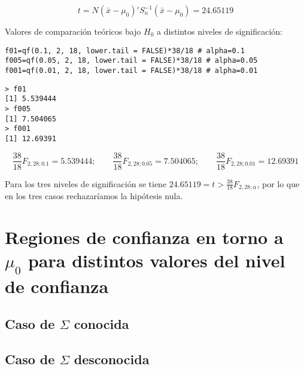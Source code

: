 \documentclass[12pt]{article}
\begin{document}
\[t=N(\bar{x}-\mu_0)'S_n^{-1}(\bar{x}-\mu_0)=24.65119\]

Valores de comparación teóricos bajo $H_0$ a distintos niveles de significación:

\begin{verbatim}
f01=qf(0.1, 2, 18, lower.tail = FALSE)*38/18 # alpha=0.1
f005=qf(0.05, 2, 18, lower.tail = FALSE)*38/18 # alpha=0.05
f001=qf(0.01, 2, 18, lower.tail = FALSE)*38/18 # alpha=0.01
\end{verbatim}

\begin{verbatim}
> f01
[1] 5.539444
> f005
[1] 7.504065
> f001
[1] 12.69391
\end{verbatim}

\[\frac{38}{18}F_{2,28;0.1}=5.539444 ; \qquad \frac{38}{18}F_{2,28;0.05}=7.504065 ; \qquad \frac{38}{18}F_{2,28;0.01}=12.69391\]

Para los tres niveles de significación se tiene
$24.65119=t>\frac{38}{18}F_{2,28;\alpha}$, por lo que en los tres casos
rechazaríamos la hipótesis nula.

\section{Regiones de confianza en torno a $\mu_0$ para distintos
  valores del nivel de confianza}

\subsection{Caso de $\Sigma$ conocida}

\subsection{Caso de $\Sigma$ desconocida}
\end{document}
